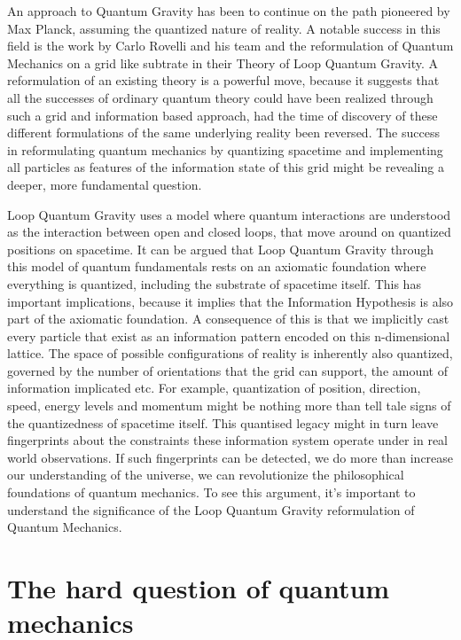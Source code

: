 \documentclass[notitlepage]{report}
\begin{document}
An approach to Quantum Gravity has been to continue on the path pioneered by Max Planck, assuming the quantized nature of reality. A notable success in this field is the work by Carlo Rovelli and his team and the reformulation of Quantum Mechanics on a grid like subtrate in their Theory of Loop Quantum Gravity. A reformulation of an existing theory is a powerful move, because it suggests that all the successes of ordinary quantum theory could have been realized through such a grid and information based approach, had the time of discovery of these different formulations of the same underlying reality been reversed. The success in reformulating quantum mechanics by quantizing spacetime and implementing all particles as features of the information state of this grid might be revealing  a deeper, more fundamental question.

Loop Quantum Gravity uses a model where quantum interactions are understood as the interaction between open and closed loops, that move around on quantized positions on spacetime. It can be argued that Loop Quantum Gravity through this model of quantum fundamentals rests on an axiomatic foundation where everything is quantized, including the substrate of spacetime itself. This has important implications, because it implies that the Information Hypothesis is also part of the axiomatic foundation. A consequence of this is that we implicitly cast every particle that exist as an information pattern encoded on this n-dimensional lattice. 
The space of possible  configurations of reality is inherently also quantized, governed by the number of orientations that the grid can support, the amount of information implicated etc. For example, quantization of position, direction, speed, energy levels and momentum might be nothing more than tell tale signs of the quantizedness of spacetime itself. This quantised legacy might in turn leave fingerprints about the constraints these information system operate under in real world observations.  If such fingerprints can be detected, we do more than increase our understanding of the universe, we can revolutionize the philosophical foundations of quantum mechanics. To see this argument, it's important to understand the significance of the Loop Quantum Gravity reformulation of Quantum Mechanics.

\section{The hard question of quantum mechanics}
\end{document}
